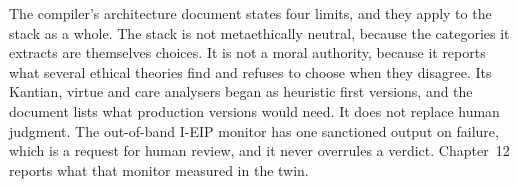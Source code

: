 The compiler's architecture document states four limits, and they apply to the stack as a whole.
The stack is not metaethically neutral, because the categories it extracts are themselves
choices. It is not a moral authority, because it reports what several ethical theories find and
refuses to choose when they disagree. Its Kantian, virtue and care analysers began as heuristic
first versions, and the document lists what production versions would need. It does not replace
human judgment. The out-of-band I-EIP monitor has one sanctioned output on failure, which is a
request for human review, and it never overrules a verdict.
Chapter~12 reports what that monitor measured in the twin.
